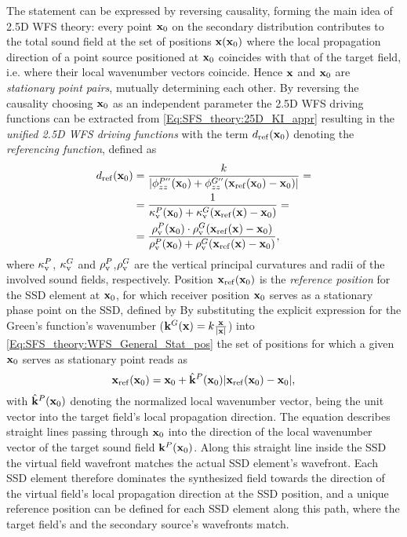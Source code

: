 The statement can be expressed by reversing causality, forming the main idea of 2.5D WFS theory: 
every point $\mathbf{x}_0$ on the secondary distribution contributes to the total sound field at the set of positions $\mathbf{x}(\mathbf{x}_0)$ where the local propagation direction of a point source positioned at $\mathbf{x}_0$ coincides with that of the target field, i.e. where their local wavenumber vectors coincide.
Hence $\mathbf{x}$ and $\mathbf{x}_0$ are \emph{stationary point pairs}, mutually determining each other.
By reversing the causality choosing $\mathbf{x}_0$ as an independent parameter the 2.5D WFS driving functions can be extracted from \eqref{Eq:SFS_theory:25D_KI_appr} resulting in the \emph{unified 2.5D WFS driving functions}
with the term $d_{\mathrm{ref}}(\mathbf{x}_0)$ denoting the \emph{referencing function}, defined as
\begin{align}
\label{Eq:SFS_theory:Referencing function}
d_{\mathrm{ref}}(\mathbf{x}_0) &= \frac{k}{|\phi^{P''}_{zz}(\mathbf{x}_0) +\phi^{G''}_{zz}(\mathbf{x}_{\mathrm{ref}}(\mathbf{x}_0)-\mathbf{x}_0)|} =\\
		 	&= \frac{1}{\kappa_\mathrm{v}^P(\mathbf{x}_0)+ \kappa_\mathrm{v}^G(\mathbf{x}_{\mathrm{ref}}(\mathbf{x})-\mathbf{x}_0)}  = \\
			&= \frac{\rho_\mathrm{v}^P(\mathbf{x}_0) \cdot \rho_\mathrm{v}^G(\mathbf{x}_{\mathrm{ref}}(\mathbf{x})-\mathbf{x}_0)}{\rho_\mathrm{v}^P(\mathbf{x}_0)+ \rho_\mathrm{v}^G(\mathbf{x}_{\mathrm{ref}}(\mathbf{x})-\mathbf{x}_0)} 
,
\end{align}
where $\kappa_\mathrm{v}^P$, $\kappa_\mathrm{v}^G$ and $\rho_\mathrm{v}^P$,$\rho_\mathrm{v}^G$ are the vertical principal curvatures and radii of the involved sound fields, respectively.
Position $\mathbf{x}_{\mathrm{ref}}(\mathbf{x}_0)$ is the \emph{reference position} for the SSD element at $\mathbf{x}_0$, for which receiver position $\mathbf{x}_0$ serves as a stationary phase point on the SSD, defined by
By substituting the explicit expression for the Green's function's wavenumber ($\mathbf{k}^G(\mathbf{x}) = k\frac{\mathbf{x}}{|\mathbf{x}|}$) into \eqref{Eq:SFS_theory:WFS_General_Stat_pos} the set of positions for which a given $\mathbf{x}_0$ serves as stationary point reads as 
\begin{equation}
\mathbf{x}_{\mathrm{ref}}(\mathbf{x}_0) = \mathbf{x}_0 + \hat{\mathbf{k}}^P(\mathbf{x}_0) |\mathbf{x}_{\mathrm{ref}}(\mathbf{x}_0)-\mathbf{x}_0|,
\end{equation} 
with $\hat{\mathbf{k}}^P(\mathbf{x}_0)$ denoting the normalized local wavenumber vector, being the unit vector into the target field's local propagation direction.
The equation describes straight lines passing through $\mathbf{x}_0$ into the direction of the local wavenumber vector of the target sound field $\mathbf{k}^P(\mathbf{x}_0)$.
Along this straight line inside the SSD the virtual field wavefront matches the actual SSD element's wavefront.
Each SSD element therefore dominates the synthesized field towards the direction of the virtual field's local propagation direction at the SSD position, and a unique reference position can be defined for each SSD element along this path, where the target field's and the secondary source's wavefronts match.

